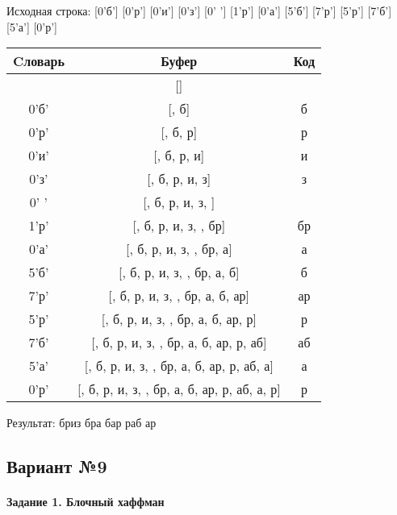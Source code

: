 \documentclass[a4paper, 12pt]{article}
\begin{document}
Исходная строка: [0'б'] [0'р'] [0'и'] [0'з'] [0' '] [1'р'] [0'а'] [5'б'] [7'р'] [5'р'] [7'б'] [5'а'] [0'р']\\
\begin{table}[h!]
\centering
\begin{tabular}{|c|c|c|}
\hline
 Cловарь & Буфер & Код  \\ \hline
 & [] & 
\\ \hline
0'б' & [, б] & б
\\ \hline
0'р' & [, б, р] & р
\\ \hline
0'и' & [, б, р, и] & и
\\ \hline
0'з' & [, б, р, и, з] & з
\\ \hline
0' ' & [, б, р, и, з,  ] &  
\\ \hline
1'р' & [, б, р, и, з,  , бр] & бр
\\ \hline
0'а' & [, б, р, и, з,  , бр, а] & а
\\ \hline
5'б' & [, б, р, и, з,  , бр, а,  б] &  б
\\ \hline
7'р' & [, б, р, и, з,  , бр, а,  б, ар] & ар
\\ \hline
5'р' & [, б, р, и, з,  , бр, а,  б, ар,  р] &  р
\\ \hline
7'б' & [, б, р, и, з,  , бр, а,  б, ар,  р, аб] & аб
\\ \hline
5'а' & [, б, р, и, з,  , бр, а,  б, ар,  р, аб,  а] &  а
\\ \hline
0'р' & [, б, р, и, з,  , бр, а,  б, ар,  р, аб,  а, р] & р
\\ \hline
\end{tabular}
\end{table}

Результат: бриз бра бар раб ар
\pagebreak
\subsection{Вариант №9}
\paragraph{Задание 1. Блочный хаффман \\}
\end{document}

